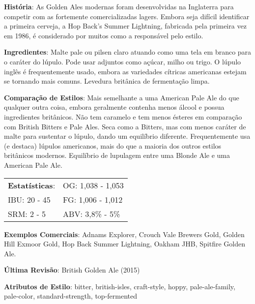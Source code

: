 \textbf{História}: As Golden Ales modernas foram desenvolvidas na Inglaterra para competir com as fortemente comercializadas lagers. Embora seja difícil identificar a primeira cerveja, a Hop Back's Summer Lightning, fabricada pela primeira vez em 1986, é considerado por muitos como a responsável pelo estilo.

\textbf{Ingredientes}: Malte pale ou pilsen claro atuando como uma tela em branco para o caráter do lúpulo. Pode usar adjuntos como açúcar, milho ou trigo. O lúpulo inglês é frequentemente usado, embora as variedades cítricas americanas estejam se tornando mais comuns. Levedura britânica de fermentação limpa.

\textbf{Comparação de Estilos}: Mais semelhante a uma American Pale Ale do que qualquer outra coisa, embora geralmente contenha menos álcool e possua ingredientes britânicos. Não tem caramelo e tem menos ésteres em comparação com British Bitters e Pale Ales. Seca como a Bitters, mas com menos caráter de malte para sustentar o lúpulo, dando um equilíbrio diferente. Frequentemente usa (e destaca) lúpulos americanos, mais do que a maioria dos outros estilos britânicos modernos. Equilíbrio de lupulagem entre uma Blonde Ale e uma American Pale Ale.

\begin{tabular}{@{}p{35mm}p{35mm}@{}}
  \textbf{Estatísticas}: & OG: 1,038 - 1,053 \\
  IBU: 20 - 45  & FG: 1,006 - 1,012  \\
  SRM: 2 - 5  & ABV: 3,8\% - 5\%
\end{tabular}

\textbf{Exemplos Comerciais}: Adnams Explorer, Crouch Vale Brewers Gold, Golden Hill Exmoor Gold, Hop Back Summer Lightning, Oakham JHB, Spitfire Golden Ale.

\textbf{Última Revisão}: British Golden Ale (2015)

\textbf{Atributos de Estilo}: bitter, british-isles, craft-style, hoppy, pale-ale-family, pale-color, standard-strength, top-fermented
